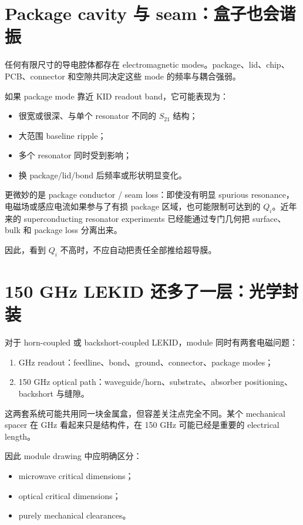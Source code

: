 \section{Package cavity 与 seam：盒子也会谐振}

任何有限尺寸的导电腔体都存在 electromagnetic modes。package、lid、chip、PCB、connector 和空隙共同决定这些 mode 的频率与耦合强弱。

如果 package mode 靠近 KID readout band，它可能表现为：

\begin{itemize}
  \item 很宽或很深、与单个 resonator 不同的 $S_{21}$ 结构；
  \item 大范围 baseline ripple；
  \item 多个 resonator 同时受到影响；
  \item 换 package/lid/bond 后频率或形状明显变化。
\end{itemize}

更微妙的是 package conductor / seam loss：即使没有明显 spurious resonance，电磁场或感应电流如果参与了有损 package 区域，也可能限制可达到的 $Q_i$。近年来的 superconducting resonator experiments 已经能通过专门几何把 surface、bulk 和 package loss 分离出来。

因此，看到 $Q_i$ 不高时，不应自动把责任全部推给超导膜。

\section{150 GHz LEKID 还多了一层：光学封装}

对于 horn-coupled 或 backshort-coupled LEKID，module 同时有两套电磁问题：

\begin{enumerate}
  \item GHz readout：feedline、bond、ground、connector、package modes；
  \item 150 GHz optical path：waveguide/horn、substrate、absorber positioning、backshort 与缝隙。
\end{enumerate}

这两套系统可能共用同一块金属盒，但容差关注点完全不同。某个 mechanical spacer 在 GHz 看起来只是结构件，在 150 GHz 可能已经是重要的 electrical length。

因此 module drawing 中应明确区分：

\begin{itemize}
  \item microwave critical dimensions；
  \item optical critical dimensions；
  \item purely mechanical clearances。
\end{itemize}

